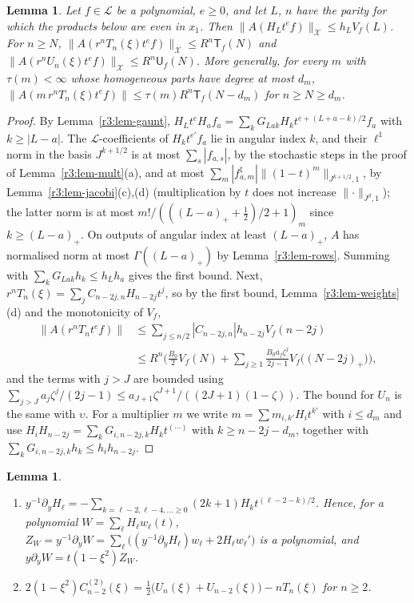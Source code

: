 \documentclass[11pt]{amsart}
\newtheorem{lemma}[theorem]{Lemma}
\theoremstyle{definition}
\theoremstyle{remark}
\numberwithin{equation}{section}
\newcommand{\nrm}[1]{\lVert #1\rVert}
\begin{document}
\begin{lemma}\label{r3:lem-V}
Let $f\in\mathcal L$ be a polynomial, $e\geq0$, and let $L$, $n$ have the parity for which the products below are even in $x_1$. Then $\nrm{A(H_Lt^ef)}_{\mathcal X}\leq h_LV_f(L)$. For $n\geq N$, $\nrm{A(r^nT_n(\xi)t^ef)}_{\mathcal X}\leq R^n\mathsf T_f(N)$ and $\nrm{A(r^nU_n(\xi)t^ef)}_{\mathcal X}\leq R^n\mathsf U_f(N)$. More generally, for every $m$ with $\tau(m)<\infty$ whose homogeneous parts have degree at most $d_m$, $\nrm{A(m\,r^nT_n(\xi)t^ef)}\leq\tau(m)R^n\mathsf T_f(N-d_m)$ for $n\geq N\geq d_m$.
\end{lemma}

\begin{proof}
By Lemma~\ref{r3:lem-gaunt}, $H_Lt^eH_af_a=\sum_kG_{Lak}H_kt^{e+(L+a-k)/2}f_a$ with $k\geq|L-a|$. The $\mathcal L$-coefficients of $H_kt^{e'}f_a$ lie in angular index $k$, and their $\ell^1$ norm in the basis $J^{k+1/2}$ is at most $\sum_s|f_{a,s}|$, by the stochastic steps in the proof of Lemma~\ref{r3:lem-mult}(a), and at most $\sum_m|f^\natural_{a,m}|\nrm{(1-t)^m}_{J^{k+1/2},1}$, by Lemma~\ref{r3:lem-jacobi}(c),(d) (multiplication by $t$ does not increase $\nrm\cdot_{J^\beta,1}$); the latter norm is at most $m!/(((L-a)_++\frac12)/2+1)_m$ since $k\geq(L-a)_+$. On outputs of angular index at least $(L-a)_+$, $A$ has normalised norm at most $\Gamma((L-a)_+)$ by Lemma~\ref{r3:lem-rows}. Summing with $\sum_kG_{Lak}h_k\leq h_Lh_a$ gives the first bound. Next, $r^nT_n(\xi)=\sum_jC_{n-2j,n}H_{n-2j}t^j$, so by the first bound, Lemma~\ref{r3:lem-weights}(d) and the monotonicity of $V_f$,
\begin{align*}
\nrm{A(r^nT_nt^ef)}&\leq\sum_{j\leq n/2}|C_{n-2j,n}|h_{n-2j}V_f(n-2j)\\
&\leq R^n\Big(\frac{B_0}2V_f(N)+\sum_{j\geq1}\frac{B_0a_j\zeta^j}{2j-1}V_f\big((N-2j)_+\big)\Big),
\end{align*}
and the terms with $j>J$ are bounded using $\sum_{j>J}a_j\zeta^j/(2j-1)\leq a_{J+1}\zeta^{J+1}/((2J+1)(1-\zeta))$. The bound for $U_n$ is the same with $\upsilon$. For a multiplier $m$ we write $m=\sum m_{i,k'}H_it^{k'}$ with $i\leq d_m$ and use $H_iH_{n-2j}=\sum_kG_{i,n-2j,k}H_kt^{(\cdots)}$ with $k\geq n-2j-d_m$, together with $\sum_kG_{i,n-2j,k}h_k\leq h_ih_{n-2j}$.
\end{proof}

\begin{lemma}\label{r3:lem-axis}
\begin{enumerate}[label=\textup{(\alph*)}]
\item $y^{-1}\partial_yH_\ell=-\sum_{k=\ell-2,\ell-4,\ldots\geq0}(2k+1)H_kt^{(\ell-2-k)/2}$. Hence, for a polynomial $W=\sum_\ell H_\ell w_\ell(t)$, $Z_W=y^{-1}\partial_yW=\sum_\ell\big((y^{-1}\partial_yH_\ell)w_\ell+2H_\ell w_\ell'\big)$ is a polynomial, and $y\partial_yW=t(1-\xi^2)Z_W$.
\item $2(1-\xi^2)C^{(2)}_{n-2}(\xi)=\frac12\big(U_n(\xi)+U_{n-2}(\xi)\big)-nT_n(\xi)$ for $n\geq2$.
\end{enumerate}
\end{lemma}
\end{document}
